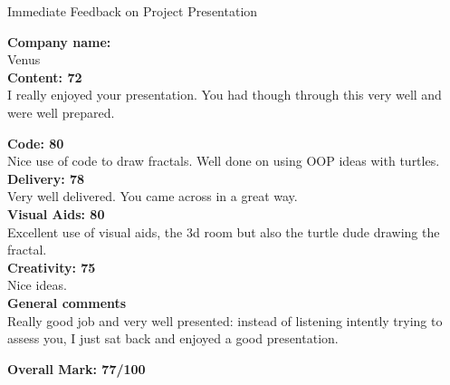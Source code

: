 \documentclass{article}
\begin{document}
\begin{center}
\Huge{Immediate Feedback on Project Presentation}\\
\end{center}


\normalsize
\textbf{Company name:}\\

Venus \\

\textbf{Content: 72}\\

I really enjoyed your presentation.
You had though through this very well and were well prepared.


\textbf{Code: 80}\\

Nice use of code to draw fractals.
Well done on using OOP ideas with turtles.\\

\textbf{Delivery: 78}\\

Very well delivered.
You came across in a great way.\\

\textbf{Visual Aids: 80}\\

Excellent use of visual aids, the 3d room but also the turtle dude drawing the fractal.\\

\textbf{Creativity: 75}\\

Nice ideas.\\

\textbf{General comments}\\

Really good job and very well presented: instead of listening intently trying to assess you, I just sat back and enjoyed a good presentation.

\textbf{Overall Mark: 77/100}
\end{document}
